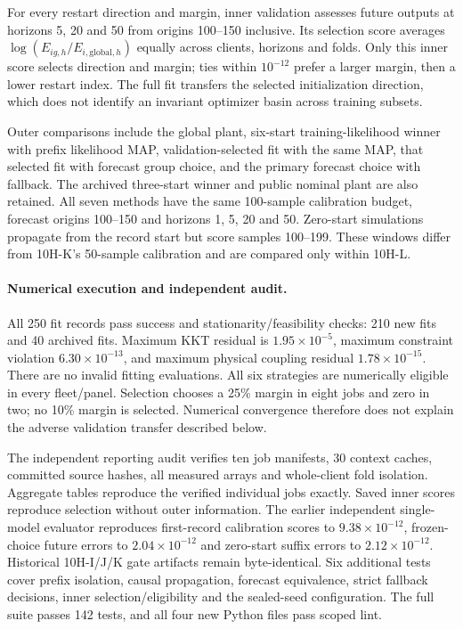 For every restart direction and margin, inner validation assesses future
outputs at horizons 5, 20 and 50 from origins 100--150 inclusive. Its selection
score averages $\log(E_{ig,h}/E_{i,\mathrm{global},h})$ equally across clients,
horizons and folds. Only this inner score selects direction and margin;
ties within $10^{-12}$ prefer a larger margin, then a lower restart index.
The full fit transfers the selected initialization direction, which does not
identify an invariant optimizer basin across training subsets.

Outer comparisons include the global plant, six-start training-likelihood
winner with prefix likelihood MAP, validation-selected fit with the same MAP,
that selected fit with forecast group choice, and the primary forecast choice
with fallback. The archived three-start winner and public nominal plant are
also retained. All seven methods have the same 100-sample calibration budget,
forecast origins 100--150 and horizons 1, 5, 20 and 50. Zero-start simulations
propagate from the record start but score samples 100--199. These windows
differ from 10H-K's 50-sample calibration and are compared only within 10H-L.

\paragraph{Numerical execution and independent audit.}
All 250 fit records pass success and stationarity/feasibility checks: 210 new
fits and 40 archived fits. Maximum KKT residual is $1.95\times10^{-5}$,
maximum constraint violation $6.30\times10^{-13}$, and maximum physical
coupling residual $1.78\times10^{-15}$. There are no invalid fitting
evaluations. All six strategies are numerically eligible in every fleet/panel.
Selection chooses a 25\% margin in eight jobs and zero in two; no 10\%
margin is selected. Numerical convergence therefore does not explain the
adverse validation transfer described below.

The independent reporting audit verifies ten job manifests, 30 context caches,
committed source hashes, all measured arrays and whole-client fold isolation.
Aggregate tables reproduce the verified individual jobs exactly. Saved inner
scores reproduce selection without outer information. The earlier independent
single-model evaluator reproduces first-record calibration scores to
$9.38\times10^{-12}$, frozen-choice future errors to $2.04\times10^{-12}$
and zero-start suffix errors to $2.12\times10^{-12}$. Historical 10H-I/J/K
gate artifacts remain byte-identical. Six additional tests cover prefix
isolation, causal propagation, forecast equivalence, strict fallback decisions,
inner selection/eligibility and the sealed-seed configuration. The full suite
passes 142 tests, and all four new Python files pass scoped lint.

